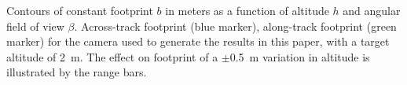 \label{fig:footprint} Contours of constant footprint $b$ in meters as a function of altitude $h$ and angular field of view $\beta$. Across-track footprint (blue marker), along-track footprint (green marker) for the camera used to generate the results in this paper, with a target altitude of 2~m. The effect on footprint of a $\pm$0.5~m variation in altitude is illustrated by the range bars.